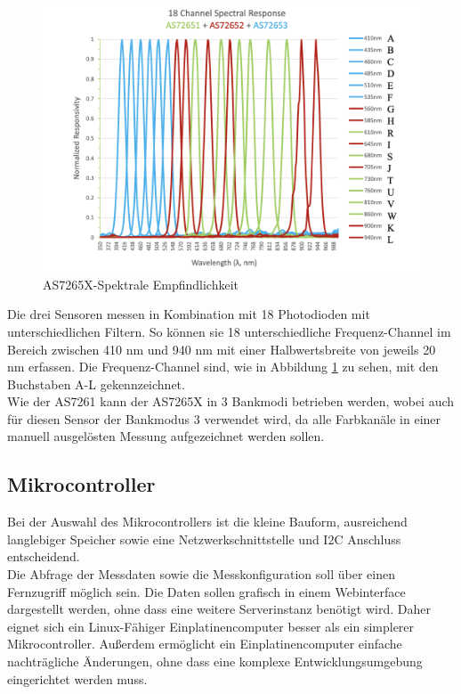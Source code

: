 \begin{figure}[H]
  \centering
 \includegraphics[width=0.9\linewidth]{img/AS7265X-Spectral_Responsivity.png}
 \caption{AS7265X-Spektrale Empfindlichkeit\cite{Datenblatt_AS7265X}}
  \label{fig:AS7261-Spectral_Responsivity}
\end{figure}

\noindent Die drei Sensoren messen in Kombination mit 18  Photodioden mit unterschiedlichen Filtern. So können sie 18 unterschiedliche Frequenz-Channel im Bereich zwischen 410 nm und 940 nm mit einer Halbwertsbreite von jeweils 20 nm erfassen.
Die Frequenz-Channel sind, wie in Abbildung \ref{fig:AS7261-Spectral_Responsivity} zu sehen, mit den Buchstaben A-L gekennzeichnet.\\
Wie der AS7261 kann der AS7265X in 3 Bankmodi betrieben werden, wobei auch für diesen Sensor der Bankmodus 3 verwendet wird, da alle Farbkanäle in einer manuell ausgelösten Messung aufgezeichnet werden sollen.
\newpage
\subsection{Mikrocontroller}\label{Mikrocontroller}
Bei der Auswahl des Mikrocontrollers ist die kleine Bauform, ausreichend langlebiger Speicher sowie eine Netzwerkschnittstelle und I2C Anschluss entscheidend.\\
Die Abfrage der Messdaten sowie die Messkonfiguration soll über einen Fernzugriff möglich sein. Die Daten sollen grafisch in einem Webinterface dargestellt werden, ohne dass eine weitere Serverinstanz benötigt wird. Daher eignet sich ein Linux-Fähiger Einplatinencomputer besser als ein simplerer Mikrocontroller.
Außerdem ermöglicht ein Einplatinencomputer einfache nachträgliche Änderungen, ohne dass eine komplexe Entwicklungsumgebung eingerichtet werden muss.\\

